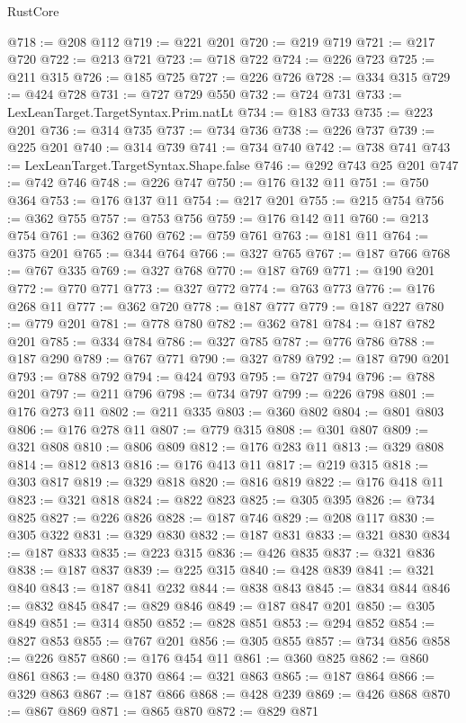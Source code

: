 \begin{lexlean}{RustCore}
\begin{coremodule}
@718 := @208 @112
@719 := @221 @201
@720 := @219 @719
@721 := @217 @720
@722 := @213 @721
@723 := @718 @722
@724 := @226 @723
@725 := @211 @315
@726 := @185 @725
@727 := @226 @726
@728 := @334 @315
@729 := @424 @728
@731 := @727 @729 @550
@732 := @724 @731
@733 := LexLeanTarget.TargetSyntax.Prim.natLt
@734 := @183 @733
@735 := @223 @201
@736 := @314 @735
@737 := @734 @736
@738 := @226 @737
@739 := @225 @201
@740 := @314 @739
@741 := @734 @740
@742 := @738 @741
@743 := LexLeanTarget.TargetSyntax.Shape.false
@746 := @292 @743 @25 @201
@747 := @742 @746
@748 := @226 @747
@750 := @176 @132 @11
@751 := @750 @364
@753 := @176 @137 @11
@754 := @217 @201
@755 := @215 @754
@756 := @362 @755
@757 := @753 @756
@759 := @176 @142 @11
@760 := @213 @754
@761 := @362 @760
@762 := @759 @761
@763 := @181 @11
@764 := @375 @201
@765 := @344 @764
@766 := @327 @765
@767 := @187 @766
@768 := @767 @335
@769 := @327 @768
@770 := @187 @769
@771 := @190 @201
@772 := @770 @771
@773 := @327 @772
@774 := @763 @773
@776 := @176 @268 @11
@777 := @362 @720
@778 := @187 @777
@779 := @187 @227
@780 := @779 @201
@781 := @778 @780
@782 := @362 @781
@784 := @187 @782 @201
@785 := @334 @784
@786 := @327 @785
@787 := @776 @786
@788 := @187 @290
@789 := @767 @771
@790 := @327 @789
@792 := @187 @790 @201
@793 := @788 @792
@794 := @424 @793
@795 := @727 @794
@796 := @788 @201
@797 := @211 @796
@798 := @734 @797
@799 := @226 @798
@801 := @176 @273 @11
@802 := @211 @335
@803 := @360 @802
@804 := @801 @803
@806 := @176 @278 @11
@807 := @779 @315
@808 := @301 @807
@809 := @321 @808
@810 := @806 @809
@812 := @176 @283 @11
@813 := @329 @808
@814 := @812 @813
@816 := @176 @413 @11
@817 := @219 @315
@818 := @303 @817
@819 := @329 @818
@820 := @816 @819
@822 := @176 @418 @11
@823 := @321 @818
@824 := @822 @823
@825 := @305 @395
@826 := @734 @825
@827 := @226 @826
@828 := @187 @746
@829 := @208 @117
@830 := @305 @322
@831 := @329 @830
@832 := @187 @831
@833 := @321 @830
@834 := @187 @833
@835 := @223 @315
@836 := @426 @835
@837 := @321 @836
@838 := @187 @837
@839 := @225 @315
@840 := @428 @839
@841 := @321 @840
@843 := @187 @841 @232
@844 := @838 @843
@845 := @834 @844
@846 := @832 @845
@847 := @829 @846
@849 := @187 @847 @201
@850 := @305 @849
@851 := @314 @850
@852 := @828 @851
@853 := @294 @852
@854 := @827 @853
@855 := @767 @201
@856 := @305 @855
@857 := @734 @856
@858 := @226 @857
@860 := @176 @454 @11
@861 := @360 @825
@862 := @860 @861
@863 := @480 @370
@864 := @321 @863
@865 := @187 @864
@866 := @329 @863
@867 := @187 @866
@868 := @428 @239
@869 := @426 @868
@870 := @867 @869
@871 := @865 @870
@872 := @829 @871

\end{coremodule}
\end{lexlean}
